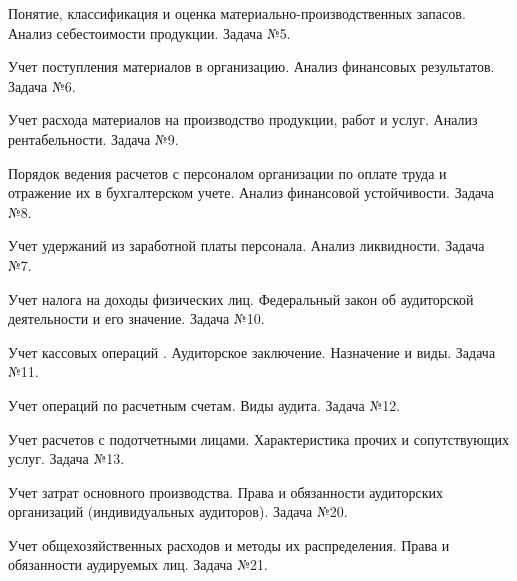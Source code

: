 \documentclass[
	11pt,
	a4paper,
	]
	{article}
\begin{document}
\bigskip

\noindent{} 
	{
		Понятие, классификация и оценка материально-производственных запасов.
	}{
		Анализ себестоимости продукции.
	}{
		Задача №5.
	}

\bigskip

\noindent{} 
	{
		Учет поступления материалов в организацию.
	}{
		Анализ финансовых результатов.
	}{
		Задача №6.
	}

\bigskip

\noindent{} 
	{
		Учет расхода материалов на производство продукции, работ и услуг.
	}{
		Анализ рентабельности.
	}{
		Задача №9.
	}

\bigskip

\noindent{} 
	{
		Порядок ведения расчетов с персоналом организации по оплате труда и отражение их в бухгалтерском учете.
	}{
		Анализ финансовой устойчивости.
	}{
		Задача №8.
	}

\bigskip

\noindent{} 
	{
		Учет удержаний из заработной платы персонала.
	}{
		Анализ ликвидности.
	}{
		Задача №7.
	}

\bigskip

\noindent{} 
	{
		Учет налога на доходы физических лиц.
	}{
		Федеральный закон об аудиторской деятельности и его значение.
	}{
		Задача №10.
	}

\bigskip

\noindent{} 
	{
		Учет кассовых операций .
	}{
		Аудиторское заключение. Назначение и виды.
	}{
		Задача №11.
	}

\bigskip

\noindent{} 
	{
		Учет операций по расчетным счетам.
	}{
		Виды аудита.
	}{
		Задача №12.
	}

\bigskip

\noindent{} 
	{
		Учет расчетов с подотчетными лицами.
	}{
		Характеристика прочих и сопутствующих услуг.
	}{
		Задача №13.
	}

\bigskip

\noindent{} 
	{
		Учет затрат основного производства.
	}{
		Права и обязанности аудиторских организаций (индивидуальных аудиторов).
	}{
		Задача №20.
	}

\bigskip

\noindent{} 
	{
		Учет общехозяйственных расходов и методы их распределения.
	}{
		Права и обязанности аудируемых лиц.
	}{
		Задача №21.
	}

\bigskip
\end{document}
